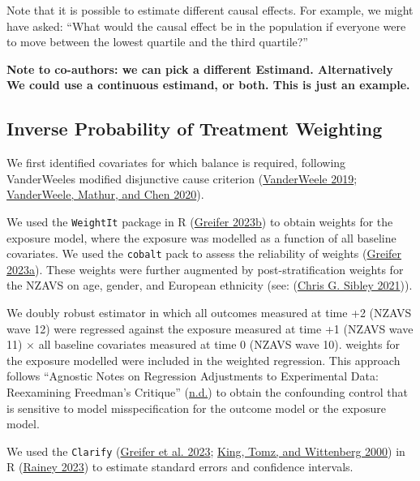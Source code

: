 \documentclass[
  singlecolumn]{report}
\begin{document}
Note that it is possible to estimate different causal effects. For
example, we might have asked: ``What would the causal effect be in the
population if everyone were to move between the lowest quartile and the
third quartile?''

\textbf{Note to co-authors: we can pick a different Estimand.
Alternatively We could use a continuous estimand, or both. This is just
an example.}

\hypertarget{inverse-probability-of-treatment-weighting}{%
\subsection{Inverse Probability of Treatment
Weighting}\label{inverse-probability-of-treatment-weighting}}

We first identified covariates for which balance is required, following
VanderWeeles modified disjunctive cause criterion
(\protect\hyperlink{ref-vanderweele2019}{VanderWeele 2019};
\protect\hyperlink{ref-vanderweele2020}{VanderWeele, Mathur, and Chen
2020}).

We used the \texttt{WeightIt} package in R
(\protect\hyperlink{ref-greifer2023a}{Greifer 2023b}) to obtain weights
for the exposure model, where the exposure was modelled as a function of
all baseline covariates. We used the \texttt{cobalt} pack to assess the
reliability of weights (\protect\hyperlink{ref-greifer2023b}{Greifer
2023a}). These weights were further augmented by post-stratification
weights for the NZAVS on age, gender, and European ethnicity (see:
(\protect\hyperlink{ref-sibley2021}{Chris G. Sibley 2021})).

We doubly robust estimator in which all outcomes measured at time +2
(NZAVS wave 12) were regressed against the exposure measured at time +1
(NZAVS wave 11) \(\times\) all baseline covariates measured at time 0
(NZAVS wave 10). weights for the exposure modelled were included in the
weighted regression. This approach follows {``Agnostic Notes on
Regression Adjustments to Experimental Data: Reexamining Freedman{'}s
Critique''} (\protect\hyperlink{ref-agnostic}{n.d.}) to obtain the
confounding control that is sensitive to model misspecification for the
outcome model or the exposure model.

We used the \texttt{Clarify}
(\protect\hyperlink{ref-greifer2023}{Greifer et al. 2023};
\protect\hyperlink{ref-king2000}{King, Tomz, and Wittenberg 2000}) in R
(\protect\hyperlink{ref-rainey2023}{Rainey 2023}) to estimate standard
errors and confidence intervals.
\end{document}
